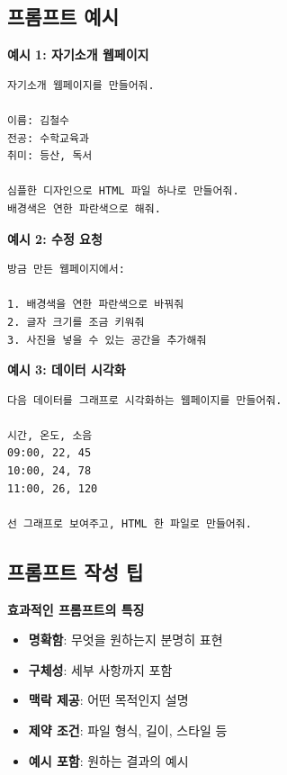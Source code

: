 \documentclass[11pt, a4paper]{article}
\begin{document}
\subsection{프롬프트 예시}

\begin{promptbox}
\textbf{예시 1: 자기소개 웹페이지}

\begin{verbatim}
자기소개 웹페이지를 만들어줘.

이름: 김철수
전공: 수학교육과
취미: 등산, 독서

심플한 디자인으로 HTML 파일 하나로 만들어줘.
배경색은 연한 파란색으로 해줘.
\end{verbatim}
\end{promptbox}

\vspace{1em}

\begin{promptbox}
\textbf{예시 2: 수정 요청}

\begin{verbatim}
방금 만든 웹페이지에서:

1. 배경색을 연한 파란색으로 바꿔줘
2. 글자 크기를 조금 키워줘
3. 사진을 넣을 수 있는 공간을 추가해줘
\end{verbatim}
\end{promptbox}

\vspace{1em}

\begin{promptbox}
\textbf{예시 3: 데이터 시각화}

\begin{verbatim}
다음 데이터를 그래프로 시각화하는 웹페이지를 만들어줘.

시간, 온도, 소음
09:00, 22, 45
10:00, 24, 78
11:00, 26, 120

선 그래프로 보여주고, HTML 한 파일로 만들어줘.
\end{verbatim}
\end{promptbox}

\subsection{프롬프트 작성 팁}

\begin{keypoint}
\textbf{효과적인 프롬프트의 특징}
\begin{itemize}
  \item \textbf{명확함}: 무엇을 원하는지 분명히 표현
  \item \textbf{구체성}: 세부 사항까지 포함
  \item \textbf{맥락 제공}: 어떤 목적인지 설명
  \item \textbf{제약 조건}: 파일 형식, 길이, 스타일 등
  \item \textbf{예시 포함}: 원하는 결과의 예시
\end{itemize}
\end{keypoint}
\end{document}
